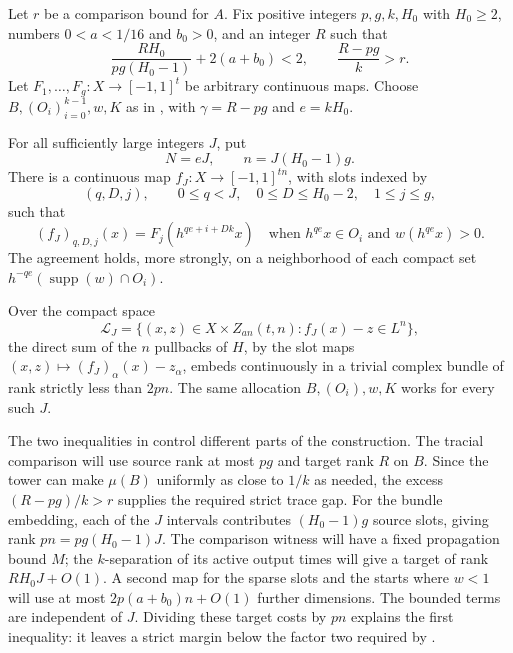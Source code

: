 \begin{proposition}
\label{prop:comparison-bundle}
Let $r$ be a comparison bound for $A$.  Fix positive integers
$p,g,k,H_0$ with $H_0\geq2$, numbers $0<a<1/16$ and $b_0>0$, and an
integer $R$ such that
\begin{equation}
\label{eq:comparison-bundle-budgets}
 \frac{RH_0}{pg(H_0-1)}+2(a+b_0)<2,
 \qquad \frac{R-pg}{k}>r.
\end{equation}
Let $F_1,\ldots,F_g:X\to[-1,1]^t$ be arbitrary continuous maps.
Choose $B,(O_i)_{i=0}^{k-1},w,K$ as in
, with $\gamma=R-pg$ and
$e=kH_0$.

For all sufficiently large integers $J$, put
\[
 N=eJ,\qquad n=J(H_0-1)g.
\]
There is a continuous map
$f_J:X\to[-1,1]^{tn}$, with slots indexed by
\[
 (q,D,j),\qquad
 0\leq q<J,\quad 0\leq D\leq H_0-2,\quad 1\leq j\leq g,
\]
such that
\begin{equation}
\label{eq:aligned-slot-agreement}
 (f_J)_{q,D,j}(x)=F_j(h^{qe+i+Dk}x)
 \quad\text{when }h^{qe}x\in O_i
       \text{ and }w(h^{qe}x)>0.
\end{equation}
The agreement holds, more strongly, on a neighborhood of each compact
set $h^{-qe}(\operatorname{supp}(w)\cap O_i)$.

Over the compact space
\begin{equation}
\label{eq:dynamical-torus-locus}
 \mathcal L_J=
 \{(x,z)\in X\times Z_{an}(t,n): f_J(x)-z\in L^n\},
\end{equation}
the direct sum of the $n$ pullbacks of $H$, by the slot maps
$(x,z)\mapsto(f_J)_\alpha(x)-z_\alpha$, embeds continuously in a
trivial complex bundle of rank strictly less than $2pn$.
The same allocation $B,(O_i),w,K$ works for every such $J$.
\end{proposition}

The two inequalities in  control
different parts of the construction. The tracial comparison will use
source rank at most $pg$ and target rank $R$ on $B$. Since the tower
can make $\mu(B)$ uniformly as close to $1/k$ as needed, the excess
$(R-pg)/k>r$ supplies the required strict trace gap.
For the bundle embedding, each of the $J$ intervals contributes
$(H_0-1)g$ source slots, giving rank $pn=pg(H_0-1)J$.
The comparison witness will have a fixed propagation bound $M$;
the $k$-separation of its active output times will give a target of
rank $RH_0J+O(1)$. A second map for the sparse slots and the starts
where $w<1$ will use at most $2p(a+b_0)n+O(1)$ further dimensions.
The bounded terms are independent of $J$. Dividing these target
costs by $pn$ explains the first inequality: it leaves a strict margin
below the factor two required by .

